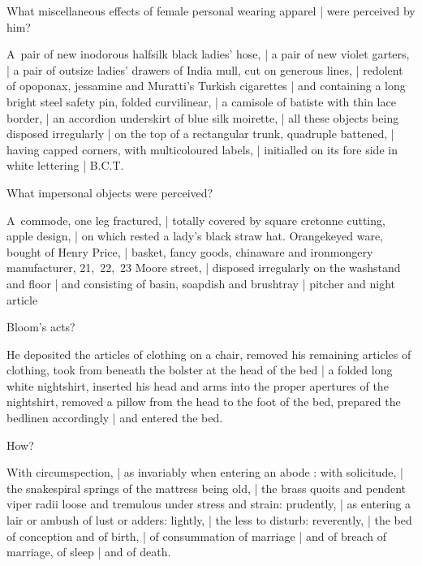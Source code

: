 What miscellaneous effects of female personal wearing apparel |
were perceived by him?

\Household
A~pair of new inodorous halfsilk black ladies' hose, |
a pair of new violet garters, |
a pair of outsize ladies' drawers of India mull,
cut on generous lines, |
redolent of opoponax, jessamine and Muratti's Turkish cigarettes |
and containing a long bright steel safety pin, folded curvilinear, |
a camisole of batiste with thin lace border, |
an accordion underskirt of blue silk moirette, |
all these objects being disposed irregularly |
on the top of a rectangular trunk, quadruple battened, |
having capped corners, with multicoloured labels, |
initialled on its fore side in white lettering |
B.C.T.~%


What impersonal objects were perceived?

\Household
A~commode,
one leg fractured, |
totally covered by square cretonne cutting, apple design, |
on which rested a lady's black straw hat.
Orangekeyed ware, bought of Henry Price, |
basket, fancy goods, chinaware and ironmongery manufacturer,
21,~22,~23 Moore street, |
disposed irregularly on the washstand and floor |
and consisting of basin, soapdish and brushtray
 |
pitcher and night article



Bloom's acts?

\Factual
He deposited the articles of clothing on a chair,
removed his remaining articles of clothing,
took from beneath the bolster at the head of the bed |
a folded long white nightshirt,
inserted his head and arms into the proper apertures of the nightshirt,
removed a pillow from the head to the foot of the bed,
prepared the bedlinen accordingly |
and entered the bed.


How?

\Turns
With circumspection, |
as invariably when entering an abode
:
with solicitude, |
the snakespiral springs of the mattress being old, |
the brass quoits and pendent viper radii
loose and tremulous under stress and strain:
prudently, |
as entering a lair or ambush of lust or adders:
lightly, |
the less to disturb:
reverently, |
the bed of conception and of birth, |
of consummation of marriage |
and of breach of marriage,
of sleep |
and of death.


